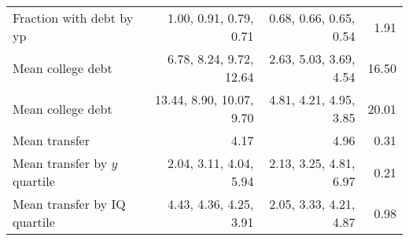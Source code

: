 \begin{tabular}{lrrr}
Fraction with debt by yp & 1.00, 0.91, 0.79, 0.71  & 0.68, 0.66, 0.65, 0.54  & 1.91  \\ 
Mean college debt & 6.78, 8.24, 9.72, 12.64  & 2.63, 5.03, 3.69, 4.54  & 16.50  \\ 
Mean college debt & 13.44, 8.90, 10.07, 9.70  & 4.81, 4.21, 4.95, 3.85  & 20.01  \\ 
Mean transfer & 4.17  & 4.96  & 0.31  \\ 
Mean transfer by $y$ quartile & 2.04, 3.11, 4.04, 5.94  & 2.13, 3.25, 4.81, 6.97  & 0.21  \\ 
Mean transfer by IQ quartile & 4.43, 4.36, 4.25, 3.91  & 2.05, 3.33, 4.21, 4.87  & 0.98  \\ 
\hline
\end{tabular}%
